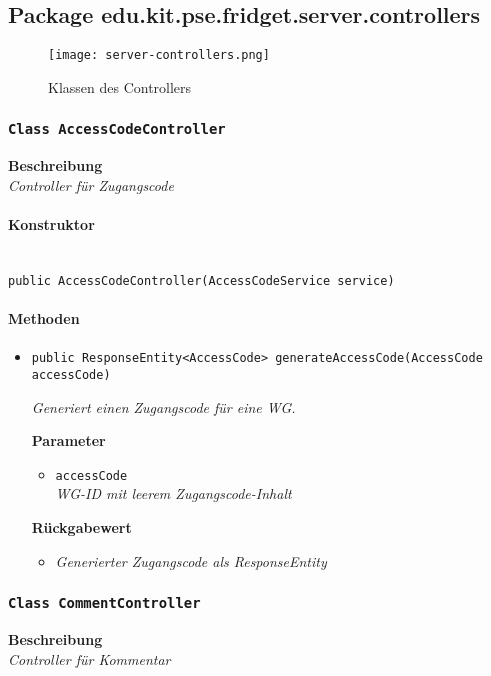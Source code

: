 

%
     \subsection{Package edu.kit.pse.fridget.server.controllers}
     \begin{figure}[H]
	       \centering
	       \texttt{[image: server-controllers.png]}
	       \caption{Klassen des Controllers}
	      \end{figure}
     \subsubsection{\texttt{Class AccessCodeController}}
     \textbf{Beschreibung} \\
     \textit{Controller für Zugangscode}
     \paragraph*{Konstruktor}\mbox{} \\
     \texttt{public AccessCodeController(AccessCodeService service)}
     \paragraph*{Methoden}
     \begin{itemize}
     	\item{\texttt{public ResponseEntity<AccessCode> generateAccessCode(AccessCode accessCode)}}
     	
     	\textit{Generiert einen Zugangscode für eine WG.}
     	
     	\textbf{Parameter}
     	\begin{itemize}
     	\item\texttt{accessCode}\\
     	\textit{WG-ID mit leerem Zugangscode-Inhalt}
     	\end{itemize}
     	\textbf{Rückgabewert}\\
     	\begin{itemize}
     	\item\textit{Generierter Zugangscode als ResponseEntity}
     	\end{itemize}
     \end{itemize}
 
     \subsubsection{\texttt{Class CommentController}}
     \textbf{Beschreibung} \\
     \textit{Controller für Kommentar}
